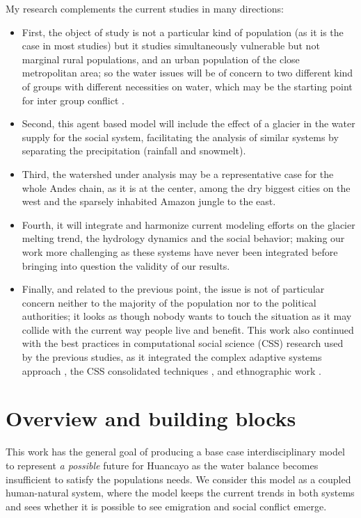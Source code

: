 \documentclass{article}
\begin{document}
My research complements the current studies in many directions: 
\begin{itemize}
\item First, the object of study is not a particular kind of population (as it is the case in most studies) but it studies simultaneously vulnerable but not marginal rural populations, and an urban population of the close metropolitan area; so the water issues will be of concern to two different kind of groups with different necessities on water, which may be the starting point for inter group conflict \cite{bar-tal_intergroup_2011}. 
\item Second, this agent based model will include the effect of a glacier in the water supply for the social system, facilitating the analysis of similar systems by separating the precipitation (rainfall and snowmelt). 
\item Third, the watershed under analysis may be a representative case for the whole Andes chain, as it is at the center, among the dry biggest cities on the west and the sparsely inhabited Amazon jungle to the east. 
\item Fourth, it will integrate and harmonize current modeling efforts on the glacier melting trend, the hydrology dynamics and the social behavior; making our work more challenging as these systems have never been integrated before bringing into question the validity of our results. 
\item Finally, and related to the previous point, the issue is not of particular concern neither to the majority of the population nor to the political authorities; it looks as though nobody wants to touch the situation as it may collide with the current way people live and benefit. This work also continued with the best practices in computational social science (CSS) research used by the previous studies, as it  integrated the complex adaptive systems approach \cite{miller_complex_2007}, the CSS consolidated techniques \cite{cioffi-revilla_introduction_2014}, and ethnographic work \cite{crate_anthropology_2009}.
\end{itemize}

\section{Overview and building blocks}

This work has the general goal of producing a base case interdisciplinary model to represent \emph{a possible} future for Huancayo as the water balance becomes insufficient to satisfy the population\textquotesingle s needs. We consider this model as a coupled human-natural system, where the model keeps the current trends in both systems and sees whether it is possible to see emigration and social conflict emerge.
\end{document}
